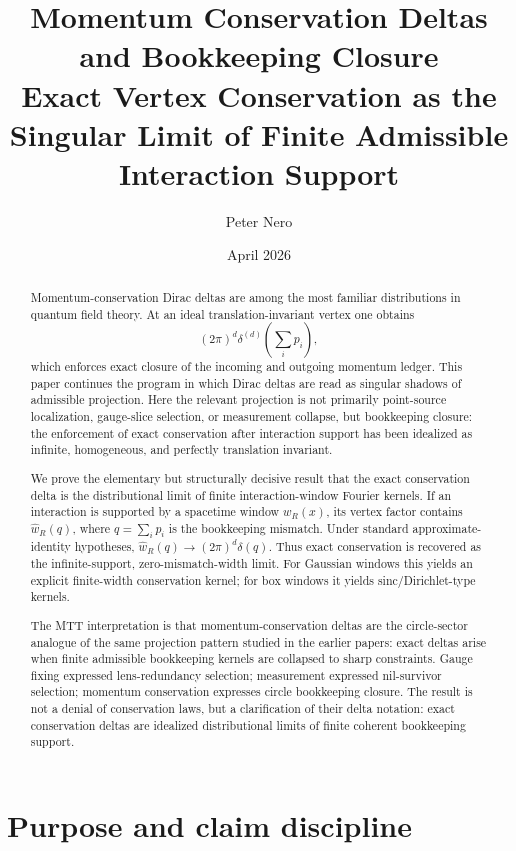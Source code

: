 \documentclass[11pt]{article}
\title{Momentum Conservation Deltas and Bookkeeping Closure\\
\large Exact Vertex Conservation as the Singular Limit of Finite Admissible Interaction Support}
\author{Peter Nero}
\date{April 2026}
\begin{document}
\maketitle

\begin{abstract}
Momentum-conservation Dirac deltas are among the most familiar distributions in quantum field theory.  At an ideal translation-invariant vertex one obtains
\[
(2\pi)^d\delta^{(d)}\!\left(\sum_i p_i\right),
\]
which enforces exact closure of the incoming and outgoing momentum ledger.  This paper continues the program in which Dirac deltas are read as singular shadows of admissible projection.  Here the relevant projection is not primarily point-source localization, gauge-slice selection, or measurement collapse, but bookkeeping closure: the enforcement of exact conservation after interaction support has been idealized as infinite, homogeneous, and perfectly translation invariant.

We prove the elementary but structurally decisive result that the exact conservation delta is the distributional limit of finite interaction-window Fourier kernels.  If an interaction is supported by a spacetime window \(w_R(x)\), its vertex factor contains \(\widehat w_R(q)\), where \(q=\sum_i p_i\) is the bookkeeping mismatch.  Under standard approximate-identity hypotheses, \(\widehat w_R(q)\to (2\pi)^d\delta(q)\).  Thus exact conservation is recovered as the infinite-support, zero-mismatch-width limit.  For Gaussian windows this yields an explicit finite-width conservation kernel; for box windows it yields sinc/Dirichlet-type kernels.

The MTT interpretation is that momentum-conservation deltas are the circle-sector analogue of the same projection pattern studied in the earlier papers: exact deltas arise when finite admissible bookkeeping kernels are collapsed to sharp constraints.  Gauge fixing expressed lens-redundancy selection; measurement expressed nil-survivor selection; momentum conservation expresses circle bookkeeping closure.  The result is not a denial of conservation laws, but a clarification of their delta notation: exact conservation deltas are idealized distributional limits of finite coherent bookkeeping support.
\end{abstract}

\seriestagline

\tableofcontents

\section{Purpose and claim discipline}
\end{document}
